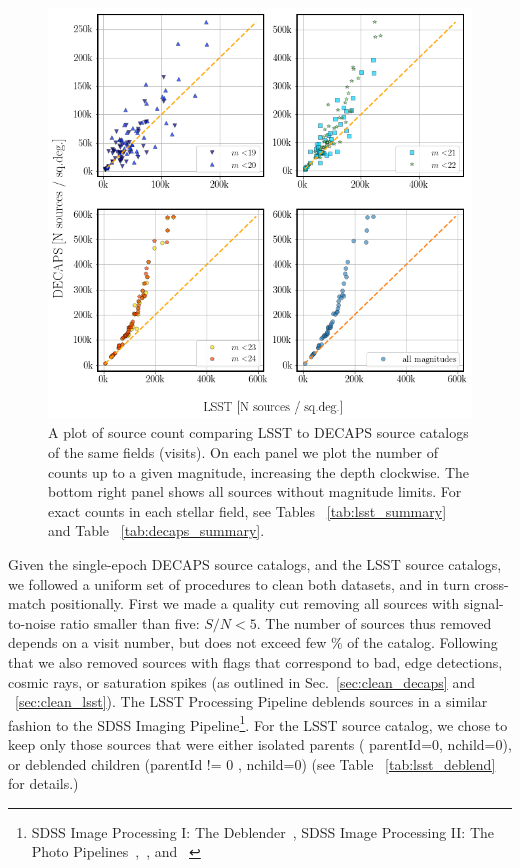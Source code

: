 \documentclass[DM,lsstdraft,toc,usenatbib]{lsstdoc}
\begin{document}
\begin{figure}
\begin{centering}
\includegraphics[width=0.9\columnwidth]{figs/decaps_lsst_source_count.png}
\caption{A plot of source count comparing LSST to DECAPS source catalogs of the same fields (visits). 
On each panel we plot the number of counts up to a given magnitude, increasing the depth clockwise. 
The bottom right panel shows all sources without magnitude limits. For exact counts in each stellar field, see  Tables ~\ref{tab:lsst_summary} and Table ~\ref{tab:decaps_summary}.}
\label{fig:lsst_count_comparison}
\end{centering}
\end{figure} 


Given the single-epoch DECAPS source catalogs, and the LSST source catalogs, we followed a uniform set of procedures to clean both datasets, and in turn cross-match positionally. First we made a quality cut removing all sources with signal-to-noise ratio smaller than five:  $S/N < 5$. The number of sources thus removed depends on a visit number, but does not exceed few \% of the catalog. Following that we also removed sources with flags that correspond to bad, edge detections, cosmic rays, or saturation spikes (as outlined in Sec.~\ref{sec:clean_decaps} and ~\ref{sec:clean_lsst}). The LSST Processing Pipeline deblends sources in a similar fashion to the SDSS Imaging Pipeline\footnote{SDSS Image Processing I: The Deblender~\citep{lupton2005}, SDSS Image Processing II: The Photo Pipelines~\citep{lupton2001},~\citep{lupton2002}, and ~\citep{lupton2005a}}.   For the LSST source catalog,  we chose to keep only those sources that were either isolated parents ( parentId=0, nchild=0), or deblended children (parentId != 0 , nchild=0) (see Table ~\ref{tab:lsst_deblend} for details.)
\end{document}
